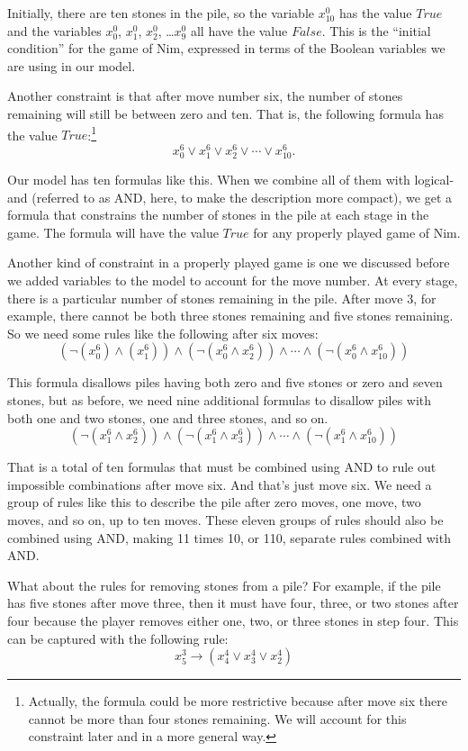{{Initially, there are ten stones in the pile,
so the variable  $x_{10}^{0}$ has the value $True$
and the variables $x_{0}^{0}$, $x_{1}^{0}$, $x_{2}^{0}$, \dots $x_{9}^{0}$
all have the value $False$.
This is the ``initial condition'' for the game of Nim,
expressed in terms of the Boolean variables we are using
in our model.

Another constraint is that after move number six,
the number of stones remaining will still be between zero and ten.
That is, the following formula has the value $True$:\footnote{Actually,
the formula could be more restrictive because
after move six there cannot be more than four stones remaining.
We will account for this constraint later and in a more general way.}
$$x_{0}^{6} \vee x_{1}^{6} \vee x_{2}^{6} \vee \cdots \vee x_{10}^{6}.$$

Our model has ten formulas like this.
When we combine all of them with logical-and
(referred to as AND, here, to make the description more compact),
we get a formula that constrains the number of stones
in the pile at each stage in the game.
The formula will have the value $True$ for any properly played game of Nim.

Another kind of constraint in a properly played game is one
we discussed before we added variables to the model to account for the move number.
At every stage, there is a particular number of stones remaining in the pile.
After move 3, for example, there cannot be both three stones remaining
and five stones remaining.
So we need some rules like the following after six moves:
$$(\neg(x_{0}^{6}) \wedge (x_{1}^{6})) \wedge (\neg(x_{0}^{6} \wedge x_{2}^{6})) \wedge \cdots \wedge (\neg(x_{0}^{6} \wedge x_{10}^{6}))$$

This formula disallows piles having both zero and five stones or zero and seven stones,
but as before, we need nine additional
formulas to disallow piles with both one and two stones, one and three stones, and so on.
$$(\neg(x_{1}^{6} \wedge x_{2}^{6})) \wedge (\neg(x_{1}^{6} \wedge x_{3}^{6})) \wedge \cdots \wedge (\neg(x_{1}^{6} \wedge x_{10}^{6}))$$

That is a total of ten formulas that must be combined using AND
to rule out impossible combinations after move six.
And that's just move six.
We need a group of rules like this to describe the pile after zero moves,
one move, two moves, and so on, up to ten moves.
These eleven groups of rules should also be combined using AND,
making 11 times 10, or 110, separate rules combined with AND.

What about the rules for removing stones from a pile?
For example, if the pile has five stones after move three,
then it must have four, three, or two stones after four
because the player removes either one, two, or three stones in step four.
This can
be captured with the following rule:
$$x_{5}^{3} \rightarrow (x_{4}^{4} \vee x_{3}^{4} \vee x_{2}^{4})$$

}}
